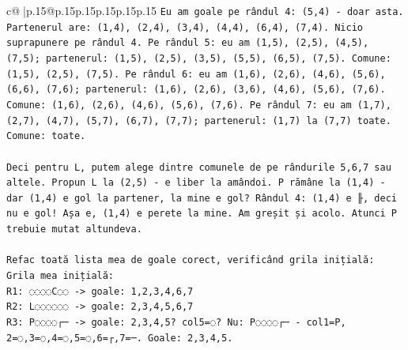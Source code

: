 \documentclass{article}
\begin{document}
{\begin{supertabular}{c@{$\;$}|p{.15\linewidth}@{}p{.15\linewidth}p{.15\linewidth}p{.15\linewidth}p{.15\linewidth}p{.15\linewidth}}
{{{\texttt{Eu am goale pe rândul 4: (5,4) {-} doar asta. Partenerul are: (1,4), (2,4), (3,4), (4,4), (6,4), (7,4). Nicio suprapunere pe rândul 4. Pe rândul 5: eu am (1,5), (2,5), (4,5), (7,5); partenerul: (1,5), (2,5), (3,5), (5,5), (6,5), (7,5). Comune: (1,5), (2,5), (7,5). Pe rândul 6: eu am (1,6), (2,6), (4,6), (5,6), (6,6), (7,6); partenerul: (1,6), (2,6), (3,6), (4,6), (5,6), (7,6). Comune: (1,6), (2,6), (4,6), (5,6), (7,6). Pe rândul 7: eu am (1,7), (2,7), (4,7), (5,7), (6,7), (7,7); partenerul: (1,7) la (7,7) toate. Comune: toate.} \\
\\ 
\texttt{Deci pentru L, putem alege dintre comunele de pe rândurile 5,6,7 sau altele. Propun L la (2,5) {-} e liber la amândoi. P rămâne la (1,4) {-} dar (1,4) e gol la partener, la mine e gol? Rândul 4: (1,4) e ╟, deci nu e gol! Așa e, (1,4) e perete la mine. Am greșit și acolo. Atunci P trebuie mutat altundeva.} \\
\\ 
\texttt{Refac toată lista mea de goale corect, verificând grila inițială:} \\
\texttt{Grila mea inițială:} \\
\texttt{R1: ◌◌◌◌C◌◌ {-}> goale: 1,2,3,4,6,7} \\
\texttt{R2: L◌◌◌◌◌◌ {-}> goale: 2,3,4,5,6,7} \\
\texttt{R3: P◌◌◌◌┌─ {-}> goale: 2,3,4,5? col5=◌? Nu: P◌◌◌◌┌─ {-} col1=P, 2=◌,3=◌,4=◌,5=◌,6=┌,7=─. Goale: 2,3,4,5.} \\
}}}
\end{supertabular}}
\end{document}
